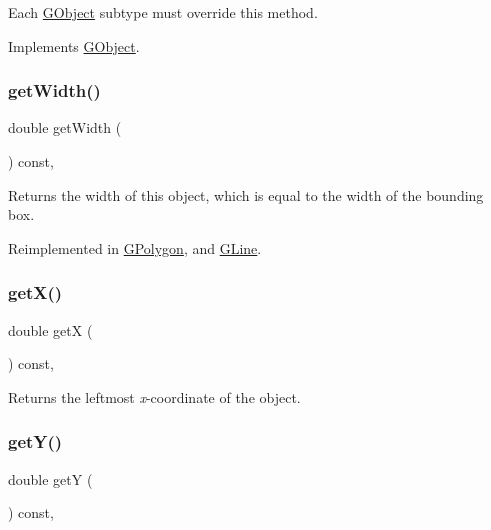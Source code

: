 Each \mbox{\hyperlink{classGObject}{G\+Object}} subtype must override this method. 

Implements \mbox{\hyperlink{classGObject_a799e073a127b428cc841086d42ea4fed}{G\+Object}}.

\mbox{\label{classGObject_a0ed2965abd4f5701d2cadf71239faf19}} 
\subsubsection{\texorpdfstring{get\+Width()}{getWidth()}}
{\footnotesize\ttfamily double get\+Width (\begin{DoxyParamCaption}{ }\end{DoxyParamCaption}) const\hspace{0.3cm}{\ttfamily [virtual]}, {\ttfamily [inherited]}}



Returns the width of this object, which is equal to the width of the bounding box. 



Reimplemented in \mbox{\hyperlink{classGPolygon_a0ed2965abd4f5701d2cadf71239faf19}{G\+Polygon}}, and \mbox{\hyperlink{classGLine_a04bee94b66c8f921cd8611be2460ba9d}{G\+Line}}.

\mbox{\label{classGObject_a344385751bee0720059403940d57a13e}} 
\subsubsection{\texorpdfstring{get\+X()}{getX()}}
{\footnotesize\ttfamily double getX (\begin{DoxyParamCaption}{ }\end{DoxyParamCaption}) const\hspace{0.3cm}{\ttfamily [virtual]}, {\ttfamily [inherited]}}



Returns the leftmost {\itshape x}-\/coordinate of the object. 

\mbox{\label{classGObject_aafa51c7f8f38a09febbb9ce7853f77b4}} 
\subsubsection{\texorpdfstring{get\+Y()}{getY()}}
{\footnotesize\ttfamily double getY (\begin{DoxyParamCaption}{ }\end{DoxyParamCaption}) const\hspace{0.3cm}{\ttfamily [virtual]}, {\ttfamily [inherited]}}



